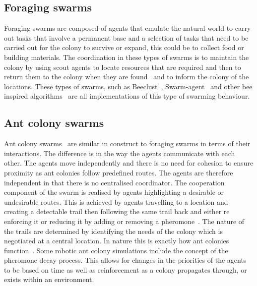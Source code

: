 \subsection{Foraging swarms}
Foraging swarms are composed of agents that emulate the natural world to carry out tasks that involve a permanent base and a selection of tasks that need to be carried out for the colony to survive or expand, this could be to collect food or building materials. The coordination in these types of swarms is to maintain the colony by using scout agents to locate resources that are required and then to return them to the colony when they are found~\cite{GP:04a, HSWN:10, LWWA:07, LWWA:10} and to inform the colony of the locations. These types of swarms, such as Beeclust~\cite{HER:11}, Swarm-agent~\cite{MFGAB:03} and other bee inspired algorithms~\cite{LAA:13} are all implementations of this type of swarming behaviour.  

\subsection{Ant colony swarms}
Ant colony swarms~\cite{SWGC:04, MGFND:05, HSSC:10, MVZ:04} are similar in construct to foraging swarms in terms of their interactions. The difference is in the way the agents communicate with each other. The agents move independently and there is no need for cohesion to ensure proximity as ant colonies follow predefined routes. The agents are therefore independent in that there is no centralised coordinator. The cooperation component of the swarm is realised by agents highlighting a desirable or undesirable routes. This is achieved by agents travelling to a location and creating a detectable trail then following the same trail back and either re enforcing it or reducing it by adding or removing a pheromone~\cite{VBBLO:15}. The nature of the trails are determined by identifying the needs of the colony which is negotiated at a central location. In nature this is exactly how ant colonies function~\cite{JRD:03}. Some robotic ant colony simulations include the concept of the pheromone decay process. This allows for changes in the priorities of the agents to be based on time as well as reinforcement as a colony propagates through, or exists within an environment.

